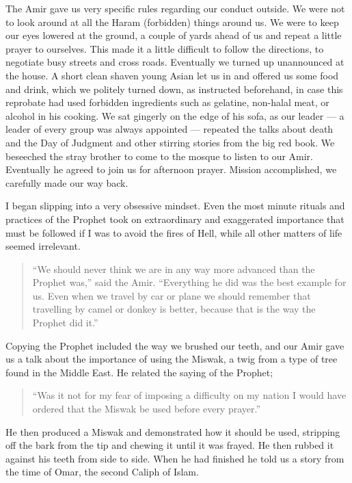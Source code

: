 \documentclass[12pt]{memoir}
\newcommand{\cor}[2]{#2} %
\begin{document}
The Amir gave us very specific rules regarding our conduct outside.
We were not to look around at all the Haram (forbidden) things around us.
We were to keep our eyes lowered at the ground,
a couple of yards ahead of us and repeat a little prayer to ourselves.
This made it a little difficult to follow the directions,
to negotiate busy streets and cross roads.
Eventually we turned up \cor{un-announced}{unannounced} at the house.
A short clean shaven young Asian let us in and offered us some food and drink,
which we politely turned down, as instructed beforehand,
in case this reprobate had used forbidden ingredients such as gelatine,
non-halal meat, or alcohol in his cooking.
We sat gingerly on the edge of his sofa, as our leader —
a leader of every group was always appointed —
repeated the talks about death and the Day of Judgment
and other stirring stories from the big red book.
We beseeched the stray brother to come to the mosque to listen to our Amir.
Eventually he agreed to join us for afternoon prayer.
Mission accomplished, we carefully made our way back.

I began slipping into a very obsessive mindset.
Even the most minute rituals and practices of the Prophet
took on extraordinary and exaggerated importance
that must be followed if I was to avoid the fires of Hell,
while all other matters of life seemed irrelevant.

\begin{quote}
“We should never think we are in any way more advanced
than the Prophet was,” said the Amir.
“Everything he did was the best example for us.
Even when we travel by car or plane we should remember
that travelling by camel or donkey is better,
because that is the way the Prophet did it.”
\end{quote}

Copying the Prophet included the way we brushed our teeth,
and our Amir gave us a talk about the importance of using the Miswak,
a twig from a type of tree found in the Middle East.
He related the saying of the Prophet;

\begin{quote}
“Was it not for my fear of imposing a difficulty on my nation
I would have ordered that the Miswak be used before every prayer.”
\end{quote}

He then produced a Miswak and demonstrated how it should be used,
stripping off the bark from the tip and chewing it until it was frayed.
He then rubbed it against his teeth from side to side.
When he had finished he told us a story from the time of Omar,
the second Caliph of Islam.
\end{document}
